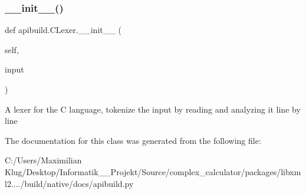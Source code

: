 \subsubsection{\texorpdfstring{\+\_\+\+\_\+init\+\_\+\+\_\+()}{\_\_init\_\_()}}
{\footnotesize\ttfamily def apibuild.\+C\+Lexer.\+\_\+\+\_\+init\+\_\+\+\_\+ (\begin{DoxyParamCaption}\item[{}]{self,  }\item[{}]{input }\end{DoxyParamCaption})}

\begin{DoxyVerb}A lexer for the C language, tokenize the input by reading and
   analyzing it line by line\end{DoxyVerb}
 

The documentation for this class was generated from the following file\+:\begin{DoxyCompactItemize}
\item 
C\+:/\+Users/\+Maximilian Klug/\+Desktop/\+Informatik\+\_\+\_\+\+Projekt/\+Source/complex\+\_\+calculator/packages/libxml2..../build/native/docs/apibuild.\+py\end{DoxyCompactItemize}

